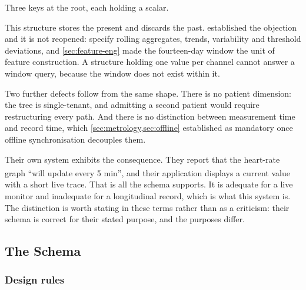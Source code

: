 \documentclass[12pt,a4paper,oneside]{report}
\newcommand{\bq}[1]{``#1''\textsuperscript{\dag}}
\begin{document}
Three keys at the root, each holding a scalar.

This structure stores the present and discards the past.  established the objection and it is not reopened: \textcite{cadrage2026} specify rolling aggregates, trends, variability and threshold deviations, and \cref{sec:feature-eng} made the fourteen-day window the unit of feature construction. A structure holding one value per channel cannot answer a window query, because the window does not exist within it.

Two further defects follow from the same shape. There is no patient dimension: the tree is single-tenant, and admitting a second patient would require restructuring every path. And there is no distinction between measurement time and record time, which \cref{sec:metrology,sec:offline} established as mandatory once offline synchronisation decouples them.

Their own system exhibits the consequence. They report that the heart-rate graph \bq{will update every 5 min}, and their application displays a current value with a short live trace. That is all the schema supports. It is adequate for a live monitor and inadequate for a longitudinal record, which is what this system is. The distinction is worth stating in these terms rather than as a criticism: their schema is correct for their stated purpose, and the purposes differ.

\subsection{The Schema}\label{sec:schema-design}

\subsubsection{Design rules}
\end{document}
